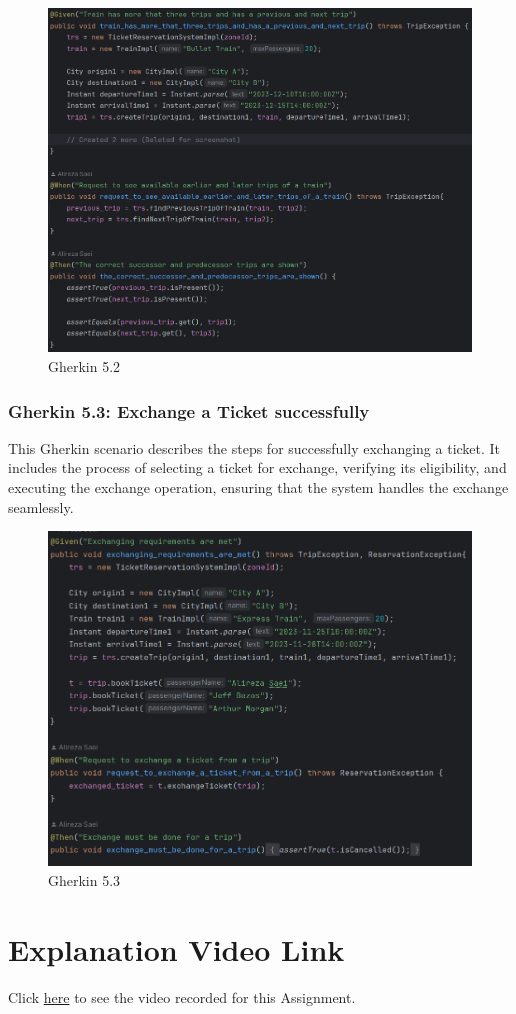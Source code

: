 \documentclass{article}
\begin{document}
\begin{figure}[h]
  \centering
  \includegraphics[width=1.0\textwidth]{pictures/T5-2.png}
  \caption{Gherkin 5.2}
  \label{fig:your_label}
\end{figure}

\pagebreak

\subsubsection{Gherkin 5.3: Exchange a Ticket successfully}

This Gherkin scenario describes the steps for successfully exchanging a ticket. It includes the process of selecting a ticket for exchange, verifying its eligibility, and executing the exchange operation, ensuring that the system handles the exchange seamlessly.

 \begin{figure}[h]
  \centering
  \includegraphics[width=1.0\textwidth]{pictures/T5-3.png}
  \caption{Gherkin 5.3}
  \label{fig:your_label}
\end{figure}

\pagebreak

\section{Explanation Video Link}

Click \href{https://www.example.com}{here} to see the video recorded for this Assignment.
\end{document}
